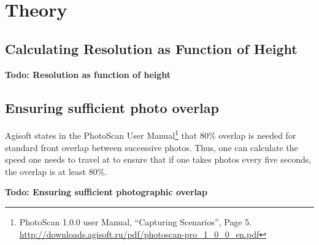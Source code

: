 \section{Theory}

\subsection{Calculating Resolution as Function of Height}

\textbf{Todo: Resolution as function of height}

\subsection{Ensuring sufficient photo overlap}

Agisoft states in the PhotoScan User Manual\footnote{PhotoScan 1.0.0 user
Manual, ``Capturing Scenarios'', Page 5.
\url{http://downloads.agisoft.ru/pdf/photoscan-pro\_1\_0\_0\_en.pdf}} that 80\%
overlap is needed for standard front overlap between successive photos. Thus,
one can calculate the speed one needs to travel at to ensure that if one takes
photos every five seconds, the overlap is at least 80\%.

\textbf{Todo: Ensuring sufficient photographic overlap}

